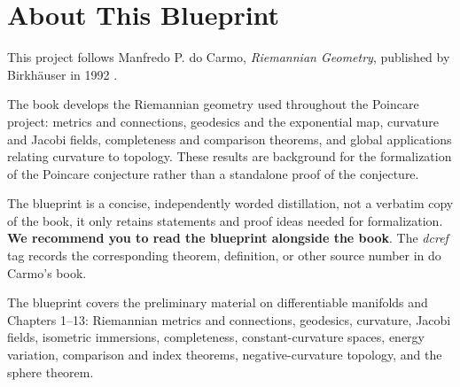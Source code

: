 \providecommand{\dcref}[1]{}      %
\providecommand{\entryref}[1]{}   %

\chapter*{About This Blueprint}

This project follows Manfredo P. do Carmo, \emph{Riemannian Geometry},
published by Birkh\"auser in 1992 \cite{doCarmo}.

The book develops the Riemannian geometry used throughout the Poincare
project: metrics and connections, geodesics and the exponential map,
curvature and Jacobi fields, completeness and comparison theorems, and global
applications relating curvature to topology. These results are background for
the formalization of the Poincare conjecture rather than a standalone proof of
the conjecture.

The blueprint is a concise, independently worded distillation, not a verbatim
copy of the book, it only retains statements and proof ideas needed for
formalization. \textbf{We recommend you to read the blueprint alongside the book}. The \emph{dcref} tag records the corresponding theorem,
definition, or other source number in do Carmo's book. 

The blueprint covers the preliminary material on differentiable manifolds and
Chapters 1--13: Riemannian metrics and connections, geodesics, curvature,
Jacobi fields, isometric immersions, completeness, constant-curvature spaces,
energy variation, comparison and index theorems, negative-curvature topology,
and the sphere theorem.















